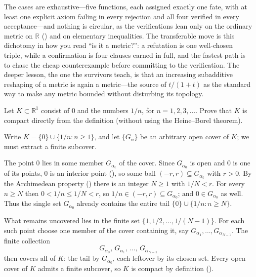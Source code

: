 \documentclass[main.tex]{subfiles}
\begin{document}
\begin{Reflection}
The cases are exhaustive---five functions, each assigned exactly one fate, with at least one explicit
axiom failing in every rejection and all four verified in every acceptance---and nothing is circular,
as the verifications lean only on the ordinary metric on $\mathbb R$ () and on elementary
inequalities. The transferable move is this dichotomy in how you read ``is it a metric?'': a refutation
is one well-chosen triple, while a confirmation is four clauses earned in full, and the fastest path is
to chase the cheap counterexample before committing to the verification. The deeper lesson, the one the
survivors teach, is that an increasing subadditive reshaping of a metric is again a metric---the source
of $t/(1+t)$ as the standard way to make any metric bounded without disturbing its topology.
\end{Reflection}

Let $K\subset\mathbb R^1$ consist of $0$ and the numbers $1/n$, for $n=1,2,3,\ldots$. Prove that $K$ is
compact directly from the definition (without using the Heine--Borel theorem).

\begin{Solution}
Write $K=\{0\}\cup\{1/n:n\ge 1\}$, and let $\{G_\alpha\}$ be an arbitrary open cover of $K$; we must
extract a finite subcover.

The point $0$ lies in some member $G_{\alpha_0}$ of the cover. Since $G_{\alpha_0}$ is open and $0$ is
one of its points, $0$ is an interior point (), so some ball $(-r,r)\subseteq G_{\alpha_0}$
with $r>0$. By the Archimedean property () there is an integer $N\ge 1$ with $1/N<r$. For
every $n\ge N$ then $0<1/n\le 1/N<r$, so $1/n\in(-r,r)\subseteq G_{\alpha_0}$; and $0\in G_{\alpha_0}$ as
well. Thus the single set $G_{\alpha_0}$ already contains the entire tail
$\{0\}\cup\{1/n:n\ge N\}$.

What remains uncovered lies in the finite set $\{1,1/2,\ldots,1/(N-1)\}$. For each such point choose one
member of the cover containing it, say $G_{\alpha_1},\ldots,G_{\alpha_{N-1}}$. The finite collection
\[
G_{\alpha_0},\,G_{\alpha_1},\,\ldots,\,G_{\alpha_{N-1}}
\]
then covers all of $K$: the tail by $G_{\alpha_0}$, each leftover by its chosen set. Every open cover of
$K$ admits a finite subcover, so $K$ is compact by definition ().
\end{Solution}
\end{document}
